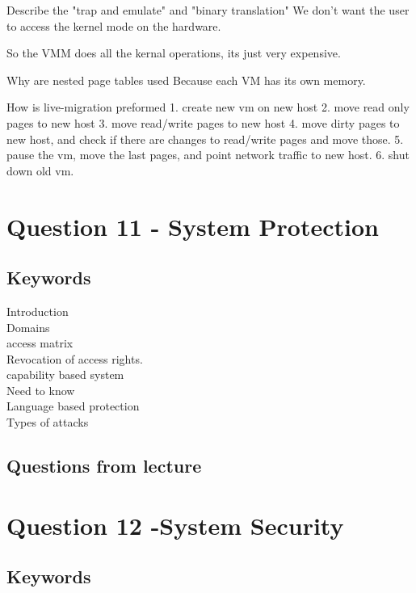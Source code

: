 \documentclass[a4paper,10pt,titlepage]{report}
\begin{document}
Describe the "trap and emulate" and "binary translation"
	We don't want the user to access the kernel mode on the hardware.
	
	So the VMM does all the kernal operations, its just very expensive.

Why are nested page tables used
	Because each VM has its own memory.
		

How is live-migration preformed
	1. create new vm on new host
	2. move read only pages to new host
	3. move read/write pages to new host
	4. move dirty pages to new host, and check if there are changes to read/write pages and move those.
	5. pause the vm, move the last pages, and point network traffic to new host.
	6. shut down old vm.



\section{Question 11 - System Protection}



\subsection{Keywords}

Introduction \\
Domains \\
	access matrix \\
Revocation of access rights.\\
capability based system\\
	Need to know \\
Language based protection\\
Types of attacks \\



\subsection{Questions from lecture}





\section{Question 12 -System Security }



\subsection{Keywords}
\end{document}
